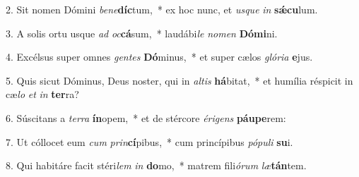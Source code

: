2. Sit nomen Dómini \textit{be}\textit{ne}\textbf{díc}tum,~*  ex hoc nunc, et \textit{us}\textit{que} \textit{in} \textbf{sǽ}\textbf{cu}lum.\

3. A solis ortu usque \textit{ad} \textit{oc}\textbf{cá}sum,~*  laudábi\textit{le} \textit{no}\textit{men} \textbf{Dó}\textbf{mi}ni.\

4. Excélsus super omnes \textit{gen}\textit{tes} \textbf{Dó}minus,~*  et super cælos \textit{gló}\textit{ri}\textit{a} \textbf{e}jus.\

5. Quis sicut Dóminus, Deus noster, qui in \textit{al}\textit{tis} \textbf{há}bitat,~*  et humília réspicit in cæ\textit{lo} \textit{et} \textit{in} \textbf{ter}ra?\

6. Súscitans a \textit{ter}\textit{ra} \textbf{ín}opem,~*  et de stércore \textit{é}\textit{ri}\textit{gens} \textbf{páu}\textbf{pe}rem:\

7. Ut cóllocet eum \textit{cum} \textit{prin}\textbf{cí}pibus,~*  cum princípibus \textit{pó}\textit{pu}\textit{li} \textbf{su}i.\

8. Qui habitáre facit stéri\textit{lem} \textit{in} \textbf{do}mo,~*  matrem fili\textit{ó}\textit{rum} \textit{læ}\textbf{tán}tem.\

